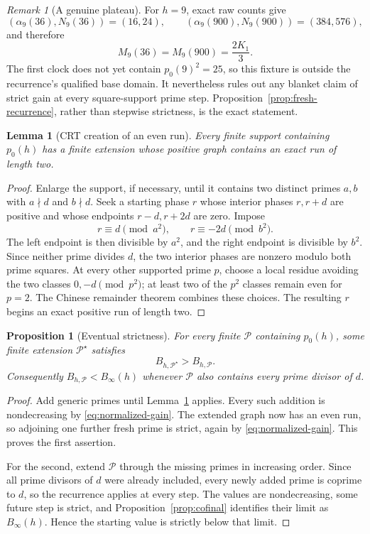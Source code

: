 \documentclass[11pt]{article}
\newtheorem{proposition}[theorem]{Proposition}
\newtheorem{lemma}[theorem]{Lemma}
\theoremstyle{definition}
\theoremstyle{remark}
\newtheorem{remark}[theorem]{Remark}
\begin{document}
\begin{remark}[A genuine plateau]
\label{rem:plateau}
For \(h=9\), exact raw counts give
\[
 (\alpha_9(36),N_9(36))=(16,24),\qquad
 (\alpha_9(900),N_9(900))=(384,576),
\]
and therefore
\[
 M_9(36)=M_9(900)=\frac{2K_1}{3}.
\]
The first clock does not yet contain \(p_0(9)^2=25\), so this fixture is
outside the recurrence's qualified base domain.  It nevertheless rules
out any blanket claim of strict gain at every square-support prime step.
Proposition~\ref{prop:fresh-recurrence}, rather than stepwise strictness,
is the exact statement.
\end{remark}

\begin{lemma}[CRT creation of an even run]
\label{lem:CRT-two-run}
Every finite support containing \(p_0(h)\) has a finite extension whose
positive graph contains an exact run of length two.
\end{lemma}

\begin{proof}
Enlarge the support, if necessary, until it contains two distinct primes
\(a,b\) with \(a\nmid d\) and \(b\nmid d\).  Seek a starting phase \(r\)
whose interior phases \(r,r+d\) are positive and whose endpoints
\(r-d,r+2d\) are zero.  Impose
\[
 r\equiv d\pmod{a^2},\qquad
 r\equiv-2d\pmod{b^2}.
\]
The left endpoint is then divisible by \(a^2\), and the right endpoint
is divisible by \(b^2\).  Since neither prime divides \(d\), the two
interior phases are nonzero modulo both prime squares.  At every other
supported prime \(p\), choose a local residue avoiding the two classes
\(0,-d\pmod{p^2}\); at least two of the \(p^2\) classes remain even for
\(p=2\).  The Chinese remainder theorem combines these choices.  The
resulting \(r\) begins an exact positive run of length two.
\end{proof}

\begin{proposition}[Eventual strictness]
\label{prop:eventual-strictness}
For every finite \(\mathcal P\) containing \(p_0(h)\), some finite
extension \(\mathcal P^\star\) satisfies
\[
 B_{h,\mathcal P^\star}>B_{h,\mathcal P}.
\]
Consequently \(B_{h,\mathcal P}<B_\infty(h)\) whenever
\(\mathcal P\) also contains every prime divisor of \(d\).
\end{proposition}

\begin{proof}
Add generic primes until Lemma~\ref{lem:CRT-two-run} applies.  Every such
addition is nondecreasing by \eqref{eq:normalized-gain}.  The extended
graph now has an even run, so adjoining one further fresh prime is
strict, again by \eqref{eq:normalized-gain}.  This proves the first
assertion.

For the second, extend \(\mathcal P\) through the missing primes in
increasing order.  Since all prime divisors of \(d\) were already
included, every newly added prime is coprime to \(d\), so the recurrence
applies at every step.  The values are nondecreasing, some future step is
strict, and Proposition~\ref{prop:cofinal} identifies their limit as
\(B_\infty(h)\).  Hence the starting value is strictly below that limit.
\end{proof}
\end{document}
